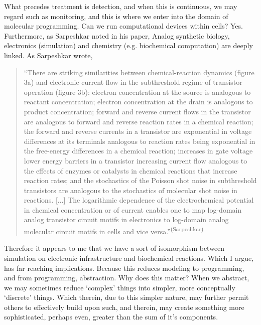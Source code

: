 What precedes treatment is detection, and when this is continuous, we may regard such as monitoring, and this is where we enter into the domain of molecular programming. Can we run computational devices within cells? Yes. Furthermore, as Sarpeshkar noted in his paper, Analog synthetic biology, electronics (simulation) and chemistry (e.g. biochemical computation) are deeply linked. As Sarpeshkar wrote,
\begin{quotation}
    ``There are striking similarities between chemical-reaction dynamics (figure 3a) and electronic current flow in the subthreshold regime of transistor operation (figure 3b): electron concentration at the source is analogous to reactant concentration; electron concentration at the drain is analogous to product concentration; forward and reverse current flows in the transistor are analogous to forward and reverse reaction rates in a chemical reaction; the forward and reverse currents in a transistor are exponential in voltage differences at its terminals analogous to reaction rates being exponential in the free-energy differences in a chemical reaction; increases in gate voltage lower energy barriers in a transistor increasing current flow analogous to the effects of enzymes or catalysts in chemical reactions that increase reaction rates; and the stochastics of the Poisson shot noise in subthreshold transistors are analogous to the stochastics of molecular shot noise in reactions. [...] The logarithmic dependence of the electrochemical potential in chemical concentration or of current enables one to map log-domain analog transistor circuit motifs in electronics to log-domain analog molecular circuit motifs in cells and vice versa.''\textsuperscript{(Sarpeshkar)}
\end{quotation}


Therefore it appears to me that we have a sort of isomorphism between simulation on electronic infrastructure and biochemical reactions. Which I argue, has far reaching implications. Because this reduces modeling to programming, and from programming, abstraction. Why does this matter? When we abstract, we may sometimes reduce `complex' things into simpler, more conceptually `discrete' things. Which therein, due to this simpler nature, may further permit others to effectively build upon such, and therein, may create something more sophisticated, perhaps even, greater than the sum of it's components.

